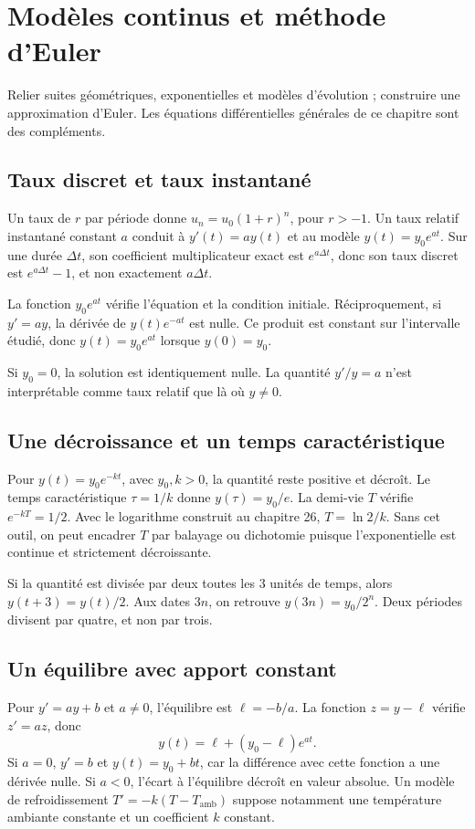 \documentclass[../cours_1re.tex]{subfiles}
\begin{document}
\setcounter{chapter}{12}
\chapter{Modèles continus et méthode d'Euler}
\label{ch:13}
\begin{objectif}
Relier suites géométriques, exponentielles et modèles d'évolution ; construire une approximation d'Euler. Les équations différentielles générales de ce chapitre sont des compléments.
\end{objectif}
\section{Taux discret et taux instantané}
Un taux de $r$ par période donne $u_n=u_0(1+r)^n$, pour $r>-1$.
Un taux relatif instantané constant $a$ conduit à $y'(t)=ay(t)$ et au modèle
$y(t)=y_0e^{at}$.
Sur une durée $\Delta t$, son coefficient multiplicateur exact est $e^{a\Delta t}$, donc son taux discret est $e^{a\Delta t}-1$, et non exactement $a\Delta t$.
\begin{demonstration}
La fonction $y_0e^{at}$ vérifie l'équation et la condition initiale. Réciproquement, si $y'=ay$, la dérivée de $y(t)e^{-at}$ est nulle. Ce produit est constant sur l'intervalle étudié, donc $y(t)=y_0e^{at}$ lorsque $y(0)=y_0$.
\end{demonstration}
Si $y_0=0$, la solution est identiquement nulle. La quantité $y'/y=a$ n'est interprétable comme taux relatif que là où $y\ne0$.
\section{Une décroissance et un temps caractéristique}
Pour $y(t)=y_0e^{-kt}$, avec $y_0,k>0$, la quantité reste positive et décroît.
Le temps caractéristique $\tau=1/k$ donne $y(\tau)=y_0/e$.
La demi-vie $T$ vérifie $e^{-kT}=1/2$.
\approfondissement Avec le logarithme construit au chapitre 26,
$T=\ln 2/k$.
Sans cet outil, on peut encadrer $T$ par balayage ou dichotomie puisque l'exponentielle est continue et strictement décroissante.
\begin{exemple}
Si la quantité est divisée par deux toutes les $3$ unités de temps, alors
$y(t+3)=y(t)/2$. Aux dates $3n$, on retrouve $y(3n)=y_0/2^n$.
Deux périodes divisent par quatre, et non par trois.
\end{exemple}
\section{Un équilibre avec apport constant}
\approfondissement Pour $y'=ay+b$ et $a\ne0$, l'équilibre est $\ell=-b/a$.
La fonction $z=y-\ell$ vérifie $z'=az$, donc
\[
y(t)=\ell+(y_0-\ell)e^{at}.
\]
Si $a=0$, $y'=b$ et $y(t)=y_0+bt$, car la différence avec cette fonction a une dérivée nulle.
Si $a<0$, l'écart à l'équilibre décroît en valeur absolue. Un modèle de refroidissement
$T'=-k(T-T_{\mathrm{amb}})$ suppose notamment une température ambiante constante et un coefficient $k$ constant.
\end{document}
